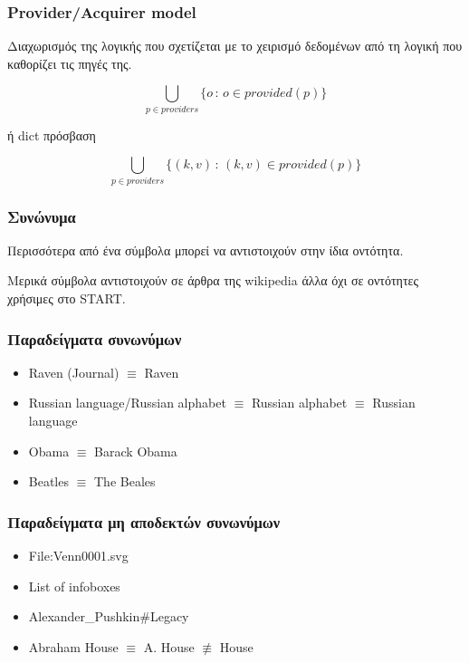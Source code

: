 \documentclass[bigger]{beamer}
\begin{document}
\begin{frame}
  \frametitle{Provider/Acquirer model}

  Διαχωρισμός της λογικής που σχετίζεται με το χειρισμό δεδομένων από
  τη λογική που καθορίζει τις πηγές της.

  \vfill

  \[
    \bigcup_{p \in providers} \{ o \, : \, o \in provided(p) \}
  \]

  ή dict πρόσβαση

  \[
    \bigcup_{p \in providers} \{ (k, v)\, : \, (k, v) \in provided(p) \}
  \]

  \vfill

\end{frame}

\begin{frame}
  \frametitle{Συνώνυμα}

  Περισσότερα από ένα σύμβολα μπορεί να αντιστοιχούν στην ίδια
  οντότητα.

  \hfill

  Μερικά σύμβολα αντιστοιχούν σε άρθρα της wikipedia άλλα όχι σε
  οντότητες χρήσιμες στο START.

\end{frame}

\begin{frame}
  \frametitle{Παραδείγματα συνωνύμων}

  \begin{itemize}
  \item Raven (Journal) \(\equiv\) Raven
  \item Russian language/Russian alphabet \(\equiv\) Russian alphabet
    \(\equiv\) Russian language
  \item Obama \(\equiv\) Barack Obama
  \item Beatles \(\equiv\) The Beales
  \end{itemize}

\end{frame}

\begin{frame}
  \frametitle{Παραδείγματα μη αποδεκτών συνωνύμων}
  \begin{itemize}
  \item File:Venn0001.svg
  \item List of infoboxes
  \item Alexander\_Pushkin\#Legacy
  \item Abraham House \(\equiv\) A. House \(\not\equiv\) House
  \end{itemize}
\end{frame}
\end{document}
